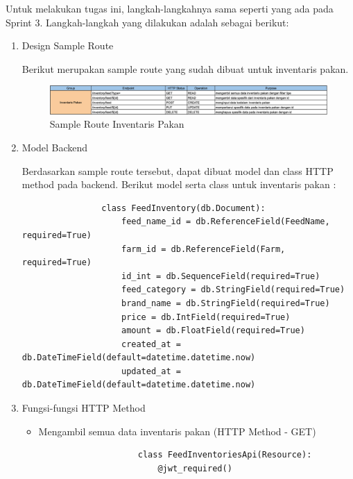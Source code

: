 \begin{spacing}{1.5}
\begin{enumerate}
		Untuk melakukan tugas ini, langkah-langkahnya sama seperti yang ada pada Sprint 3. Langkah-langkah yang dilakukan adalah sebagai berikut:

		\begin{enumerate}
			\item Design Sample Route
			
			Berikut merupakan sample route yang sudah dibuat untuk inventaris pakan.

			\begin{figure}[H]
				\centering
				\includegraphics[width=1\textwidth]{gambar/sprint4/sample_route_pakan.png}
				\caption{Sample Route Inventaris Pakan}
			\end{figure}

			\item Model Backend
 			
			Berdasarkan sample route tersebut, dapat dibuat model dan class HTTP method pada backend. Berikut model serta class untuk inventaris pakan :

			\begin{lstlisting}
				class FeedInventory(db.Document):
					feed_name_id = db.ReferenceField(FeedName, required=True)
					farm_id = db.ReferenceField(Farm, required=True)
					id_int = db.SequenceField(required=True)
					feed_category = db.StringField(required=True)
					brand_name = db.StringField(required=True)
					price = db.IntField(required=True)
					amount = db.FloatField(required=True)
					created_at = db.DateTimeField(default=datetime.datetime.now)
					updated_at = db.DateTimeField(default=datetime.datetime.now)	
			\end{lstlisting}


	
			\item Fungsi-fungsi HTTP Method
			
			\begin{itemize}
				\item Mengambil semua data inventaris pakan (HTTP Method - GET)
				
				\begin{lstlisting}
					class FeedInventoriesApi(Resource):
						@jwt_required()


\end{lstlisting}
\end{itemize}
\end{enumerate}
\end{enumerate}
\end{spacing}

